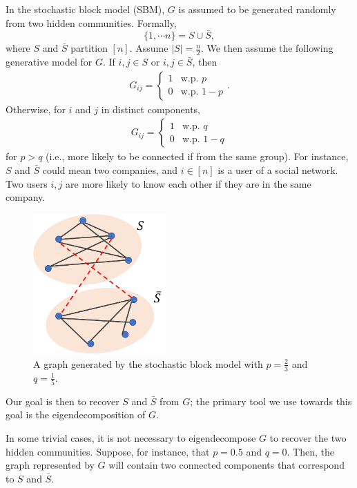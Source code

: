 In the stochastic block model (SBM), $G$ is assumed to be generated randomly from two hidden communities. Formally, 
\begin{equation}
    \{ 1, \cdots n \} = S \cup \bar{S},
\end{equation}
where $S$ and $\bar{S}$ partition $[n]$. Assume $|S| = \frac{n}{2}$. We then assume the following generative model for $G$. 
If $i,j \in S$ or $i,j \in \bar{S}$, then 
\begin{align}
    G_{ij} = \begin{cases}
        1 &\text{w.p. $p$} \\
        0 &\text{w.p. $1-p$} \end{cases}.
\end{align} 
Otherwise, for $i$ and $j$ in distinct components, 
\begin{align}
    G_{ij} = \begin{cases}
        1 &\text{w.p. $q$} \\
        0 &\text{w.p. $1-q$} \end{cases}
\end{align} 
for $p > q$ (i.e., more likely to be connected if from the same group). For instance, $S$ and $\bar{S}$ could mean two companies, and $i\in[n]$ is a user of a social network. Two users $i, j$ are more likely to know each other if they are in the same company.

\begin{figure}[ht]
	\centering
	\includegraphics[width=2in]{figures/ssl2.pdf}
	\caption{A graph generated by the stochastic block model with $p=\frac{2}{3}$ and $q=\frac{1}{5}$.}
\end{figure}


Our goal is then to recover $S$ and $\bar{S}$ from $G$; the primary tool we use towards this goal is the eigendecomposition of $G$.

In some trivial cases, it is not necessary to eigendecompose $G$ to recover the two hidden communities. Suppose, for instance, that $p = 0.5$ and $q = 0$. Then, the graph represented by $G$ will contain two connected components that correspond to $S$ and $\bar{S}$.

